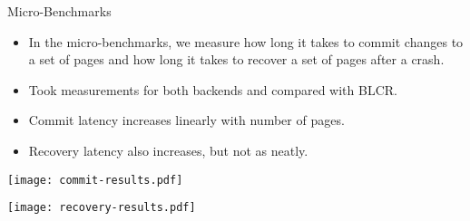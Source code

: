 \begin{block}{Micro-Benchmarks}
    \begin{itemize}
        \item In the micro-benchmarks, we measure how long it takes to commit
            changes to a set of pages and how long it takes to recover a set
            of pages after a crash.
        \item Took measurements for both backends and compared with BLCR.
        \item Commit latency increases linearly with number of pages.
        \item Recovery latency also increases, but not as neatly.
    \end{itemize}

    \vspace{1em}

    \centering
    \texttt{[image: commit-results.pdf]}

    \texttt{[image: recovery-results.pdf]}
\end{block}
